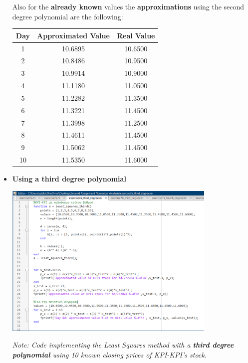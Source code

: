 \documentclass{article}
\begin{document}
\begin{itemize}
Also for the \textbf{already known} values the \textbf{approximations} using the second degree polynomial are the following:
\begin{table}[h!]
    \centering
    \begin{tabular}{@{}ccc@{}}
        \toprule
        \textbf{Day} & \textbf{Approximated Value} & \textbf{Real Value} \\ \midrule
        1 & 10.6895 & 10.6500 \\
        2 & 10.8486 & 10.9500 \\
        3 & 10.9914 & 10.9000 \\
        4 & 11.1180 & 11.0500 \\
        5 & 11.2282 & 11.3500 \\
        6 & 11.3221 & 11.4500 \\
        7 & 11.3998 & 11.2500 \\
        8 & 11.4611 & 11.4500 \\
        9 & 11.5062 & 11.4500 \\
        10 & 11.5350 & 11.6000 \\
        \bottomrule
    \end{tabular}

    
\end{table}
\newpage
    \item \textbf{Using a third degree polynomial}
    \begin{tcolorbox}[colback=red!10, colframe=gray!80, width=\textwidth, sharp corners]
    \centering 
    \includegraphics[width=0.8\textwidth,height=0.38\textheight]{Exercise7aThird.png} 

    \vspace{0.1cm}
    \small\textit{Note: Code implementing the Least Squares method with a \textbf{third degree polynomial} using 10 known closing prices of KPI-KPI's stock. }
\end{tcolorbox}



\end{itemize}
\end{document}
